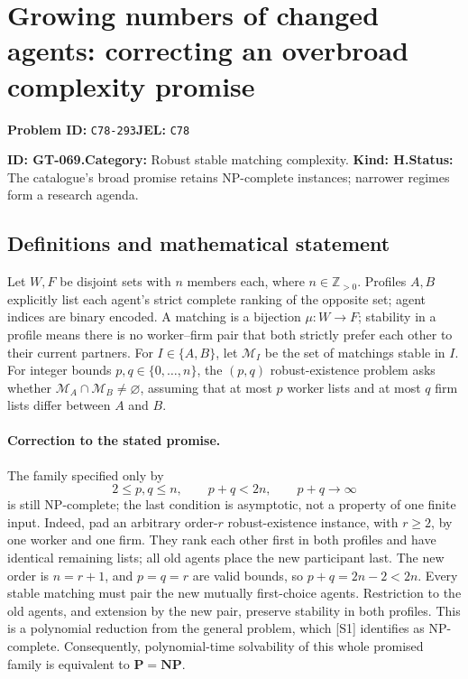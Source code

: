 \documentclass[11pt,a4paper]{article}
\begin{document}
\section*{Growing numbers of changed agents: correcting an overbroad complexity promise}
\textbf{Problem ID:} \texttt{C78-293}\quad \textbf{JEL:} \texttt{C78}\par
\label{problem:OP-0199}
\label{game:GT-069}
{\sffamily\small\color{muted}
\noindent\textbf{ID: GT-069.}\quad\textbf{Category:} Robust stable matching complexity.
\quad\textbf{Kind: H.}\quad\textbf{Status:} The catalogue's broad promise
retains NP-complete instances; narrower regimes form a research agenda.
\par}
\subsection*{Definitions and mathematical statement}
Let \(W,F\) be disjoint sets with \(n\) members each, where
\(n\in\mathbb Z_{>0}\). Profiles \(A,B\) explicitly list each agent's
strict complete ranking of the opposite set; agent indices are binary encoded.
A matching is a bijection \(\mu:W\to F\);
stability in a profile means there is no worker--firm pair that both
strictly prefer each other to their current partners. For \(I\in\{A,B\}\),
let \(\mathcal M_I\) be the set of matchings stable in \(I\).
For integer bounds \(p,q\in\{0,\ldots,n\}\),
the \((p,q)\) robust-existence problem asks whether
\(\mathcal M_A\cap\mathcal M_B\ne\varnothing\), assuming that at most
\(p\) worker lists and at most \(q\) firm lists differ between \(A\) and \(B\).

\paragraph{Correction to the stated promise.}
The family specified only by
\[
 2\leq p,q\leq n,\qquad p+q<2n,\qquad p+q\longrightarrow\infty
\]
is still NP-complete; the last condition is asymptotic, not a property
of one finite input.
Indeed, pad an arbitrary order-\(r\) robust-existence instance, with \(r\geq2\), by one
worker and one firm. They rank each other first in both profiles and
have identical remaining lists; all old agents place the new participant
last. The new order is \(n=r+1\), and \(p=q=r\) are valid bounds, so
\(p+q=2n-2<2n\).
Every stable matching must pair the new mutually first-choice agents.
Restriction to the old agents, and extension by the new pair, preserve
stability in both profiles. This is a polynomial reduction from the
general problem, which [S1] identifies as NP-complete.
Consequently, polynomial-time solvability of this whole promised family
is equivalent to \(\mathbf P=\mathbf{NP}\).
\end{document}
